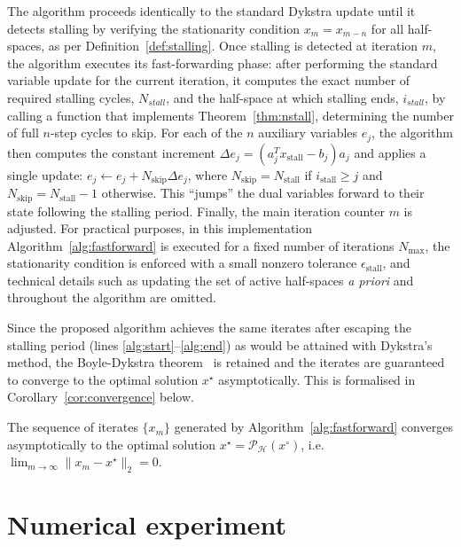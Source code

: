 \documentclass[onecolumn]{autart}
\begin{document}
The algorithm proceeds identically to the standard Dykstra update until it detects stalling by verifying the stationarity condition $x_m = x_{m-n}$ for all half-spaces, as per Definition~\ref{def:stalling}. Once stalling is detected at iteration $m$, the algorithm executes its fast-forwarding phase: after performing the standard variable update for the current iteration, it computes the exact number of required stalling cycles, $N_{stall}$, and the half-space at which stalling ends, $i_{stall}$, by calling a function that implements Theorem~\ref{thm:nstall}, determining the number of full $n$-step cycles to skip. For each of the $n$ auxiliary variables $e_j$, the algorithm then computes the constant increment $\Delta e_j = (a_j^T x_{\text{stall}} - b_j)a_j$ and applies a single update: $e_j \leftarrow e_j + N_{\text{skip}} \Delta e_j$, where $N_{\text{skip}}=N_{\text{stall}}$ if $i_{\text{stall}}\geq j$ and $N_{\text{skip}}=N_{\text{stall}}-1$ otherwise. This ``jumps'' the dual variables forward to their state following the stalling period. Finally, the main iteration counter $m$ is adjusted. For practical purposes, in this implementation Algorithm~\ref{alg:fastforward} is executed for a fixed number of iterations $N_{\text{max}}$, the stationarity condition is enforced with a small nonzero tolerance $\epsilon_{\text{stall}}$, and technical details such as updating the set of active half-spaces \textit{a priori} and throughout the algorithm are omitted.

Since the proposed algorithm achieves the same iterates after escaping the stalling period (lines \ref{alg:start}--\ref{alg:end}) as would be attained with Dykstra's method, the Boyle-Dykstra theorem~\cite{DYKSTRA} is retained and the iterates are guaranteed to converge to the optimal solution $x^\star$ asymptotically. This is formalised in Corollary~\ref{cor:convergence} below.

\begin{cor}
\label{cor:convergence}
The sequence of iterates $\{x_m\}$ generated by Algorithm~\ref{alg:fastforward} converges asymptotically to the optimal solution $x^\star = \mathcal{P}_{\mathcal{H}}(x^\circ)$, i.e.\ $\lim_{m\rightarrow\infty}\|x_m-x^\star\|_2=0$.
\end{cor}

\section{Numerical experiment} \label{sec:example}
\end{document}

